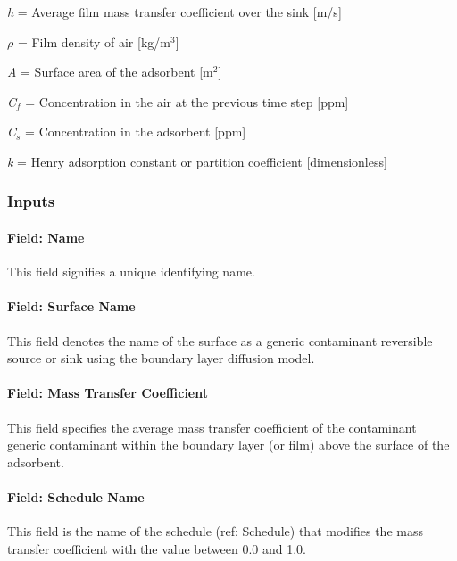 \emph{h} = Average film mass transfer coefficient over the sink {[}m/s{]}

\(\rho\) = Film density of air {[}kg/m\(^{3}\){]}

\emph{A} = Surface area of the adsorbent {[}m\(^{2}\){]}

\emph{C\(_{f}\)} = Concentration in the air at the previous time step {[}ppm{]}

\emph{C\(_{s}\)} = Concentration in the adsorbent {[}ppm{]}

\emph{k} = Henry adsorption constant or partition coefficient {[}dimensionless{]}

\subsubsection{Inputs}\label{inputs-15-006}

\paragraph{Field: Name}\label{field-name-15-004}

This field signifies a unique identifying name.

\paragraph{Field: Surface Name}\label{field-surface-name-3-000}

This field denotes the name of the surface as a generic contaminant reversible source or sink using the boundary layer diffusion model.

\paragraph{Field: Mass Transfer Coefficient}\label{field-mass-transfer-coefficient}

This field specifies the average mass transfer coefficient of the contaminant generic contaminant within the boundary layer (or film) above the surface of the adsorbent.

\paragraph{Field: Schedule Name}\label{field-schedule-name-8}

This field is the name of the schedule (ref: Schedule) that modifies the mass transfer coefficient with the value between 0.0 and 1.0.

